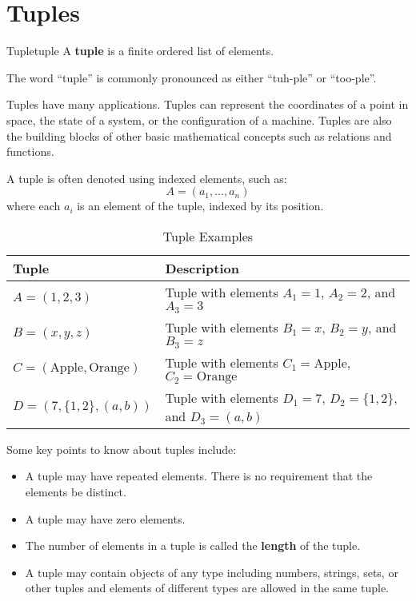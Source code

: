 \section{Tuples}
\begin{definition}{Tuple}{tuple}
  A \textbf{tuple} is a finite ordered list of elements.
\end{definition}

The word ``tuple'' is commonly pronounced as either ``tuh-ple'' or ``too-ple''.

Tuples have many applications. Tuples can represent the coordinates of a point in space,
the state of a system, or the configuration of a machine. Tuples are also the building
blocks of other basic mathematical concepts such as relations and functions.

A tuple is often denoted using indexed elements, such as:
\[
  A = (a_1, \ldots, a_n)
\]
where each \( a_i \) is an element of the tuple, indexed by its position.

\begin{table}[H]
  \centering
  \begin{tabular}{ll}
    \toprule
    \textbf{Tuple} & \textbf{Description} \\
    \midrule
    \( A = (1, 2, 3) \) & Tuple with elements \( A_1 = 1 \), \( A_2 = 2 \), and \( A_3 =3 \) \\
    \( B = (x, y, z) \) & Tuple with elements \( B_1 = x \), \( B_2 = y \), and \( B_3 = z \) \\
    \( C = (\text{Apple}, \text{Orange}) \) & Tuple with elements \( C_1 = \text{Apple} \), \( C_2 = \text{Orange} \) \\
    \( D = (7, \{1, 2\}, (a, b)) \) & Tuple with elements \( D_1 = 7 \), \( D_2 = \{1, 2\} \), and \( D_3 = (a, b) \) \\
    \bottomrule
  \end{tabular}
  \caption{Tuple Examples}
\end{table}

Some key points to know about tuples include:
\begin{itemize}
  \item A tuple may have repeated elements. There is no requirement that the elements be distinct.
  \item A tuple may have zero elements.
  \item The number of elements in a tuple is called the \textbf{length} of the tuple.
  \item A tuple may contain objects of any type including numbers, strings, sets, or other tuples
   and elements of different types are allowed in the same tuple.
\end{itemize}

